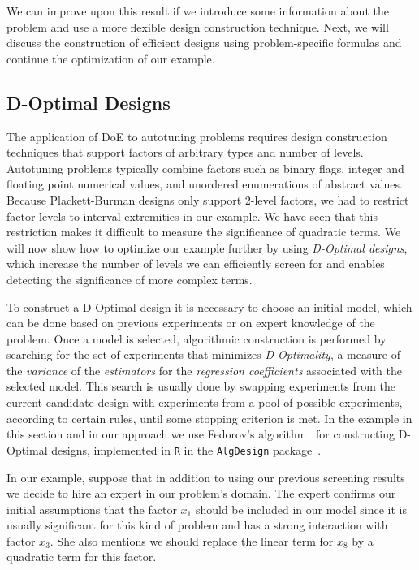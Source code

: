 \documentclass[conference]{IEEEtran}
\begin{document}
We  can improve  upon this  result if  we introduce  some information  about the
problem and  use a more  flexible design  construction technique. Next,  we will
discuss the  construction of  efficient designs using  problem-specific formulas
and continue the optimization of our example.
\subsection{D-Optimal Designs}
\label{sec:org5f2b90b}
The  application of  DoE  to autotuning  problems  requires design  construction
techniques  that  support factors  of  arbitrary  types  and number  of  levels.
Autotuning problems typically combine factors  such as binary flags, integer and
floating point numerical values, and  unordered enumerations of abstract values.
Because Plackett-Burman designs only support 2-level factors, we had to restrict
factor levels  to interval extremities  in our example.  We have seen  that this
restriction makes it  difficult to measure the significance  of quadratic terms.
We will now show how to optimize our example further by using \emph{D-Optimal designs},
which increase  the number of levels  we can efficiently screen  for and enables
detecting the significance of more complex terms.

To construct  a D-Optimal  design it  is necessary to  choose an  initial model,
which can be  done based on previous  experiments or on expert  knowledge of the
problem.  Once a  model is  selected, algorithmic  construction is  performed by
searching for the  set of experiments that minimizes \emph{D-Optimality},  a measure of
the \emph{variance} of  the \emph{estimators} for the \emph{regression  coefficients} associated with
the selected model. This search is usually done by swapping experiments from the
current candidate design  with experiments from a pool  of possible experiments,
according  to certain  rules,  until some  stopping criterion  is  met.  In  the
example   in   this   section   and   in   our   approach   we   use   Fedorov's
algorithm~\cite{fedorov1972theory}    for   constructing    D-Optimal   designs,
implemented in \texttt{R} in the \texttt{AlgDesign} package~\cite{wheeler2014algdesign}.

In our example, suppose that in addition to using our previous screening results
we decide  to hire an  expert in our problem's  domain. The expert  confirms our
initial assumptions that  the factor \(x_1\) should be included  in our model since
it is usually significant for this kind  of problem and has a strong interaction
with factor \(x_3\). She  also mentions we should replace the  linear term for \(x_8\)
by a quadratic term for this factor.
\end{document}
